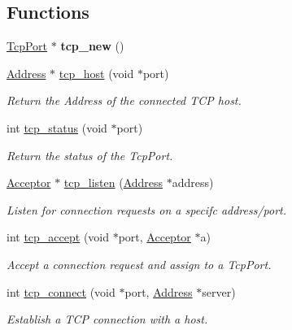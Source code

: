 \subsection*{Functions}
\begin{DoxyCompactItemize}
\item 
\mbox{\label{group__tcp_ga59fc6c5e7e9a5e2344dad80f42bbdec4}} 
\hyperlink{group__tcp_gaffe71a51b1d23f2e4e54ccfb67bb30f8}{Tcp\+Port} $\ast$ {\bfseries tcp\+\_\+new} ()
\item 
\hyperlink{group__address_ga80f2dcdb3778441e85ac8c9dbb6f324a}{Address} $\ast$ \hyperlink{group__tcp_gafcf36036563f4bf40b5ec38752b29391}{tcp\+\_\+host} (void $\ast$port)
\begin{DoxyCompactList}\small\item\em Return the Address of the connected T\+CP host. \end{DoxyCompactList}\item 
int \hyperlink{group__tcp_ga4e3db9ca684fe6b75e37dae88f3aeac4}{tcp\+\_\+status} (void $\ast$port)
\begin{DoxyCompactList}\small\item\em Return the status of the Tcp\+Port. \end{DoxyCompactList}\item 
\hyperlink{group__tcp_ga99fb3ed761c86c0379dc50f80c51c87a}{Acceptor} $\ast$ \hyperlink{group__tcp_ga2dacd5771bd75f786c01c9fb13967a18}{tcp\+\_\+listen} (\hyperlink{group__address_ga80f2dcdb3778441e85ac8c9dbb6f324a}{Address} $\ast$address)
\begin{DoxyCompactList}\small\item\em Listen for connection requests on a specifc address/port. \end{DoxyCompactList}\item 
int \hyperlink{group__tcp_ga838b072bf2904373b0555f9453e38934}{tcp\+\_\+accept} (void $\ast$port, \hyperlink{group__tcp_ga99fb3ed761c86c0379dc50f80c51c87a}{Acceptor} $\ast$a)
\begin{DoxyCompactList}\small\item\em Accept a connection request and assign to a Tcp\+Port. \end{DoxyCompactList}\item 
int \hyperlink{group__tcp_gaacf72af5cac869052f5562e9bf369bae}{tcp\+\_\+connect} (void $\ast$port, \hyperlink{group__address_ga80f2dcdb3778441e85ac8c9dbb6f324a}{Address} $\ast$server)
\begin{DoxyCompactList}\small\item\em Establish a T\+CP connection with a host. \end{DoxyCompactList}\item 

\end{DoxyCompactItemize}
